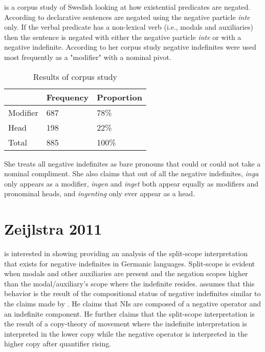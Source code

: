 \documentclass[12pt, letterpaper]{article}
\begin{document}
\ea \citet{valentinebordalNegationExistentialPredications2017} is a corpus study of Swedish looking at how existential predicates are negated. 
\ex According to \citeauthor{valentinebordalNegationExistentialPredications2017} declarative sentences are negated using the negative particle \textit{inte} only. 
\ex If the verbal predicate has a non-lexical verb (i.e., modals and auxiliaries) then the sentence is negated with either the negative particle \textit{inte} or with a negative indefinite. 
\ex According to her corpus study negative indefinites were used most frequently as a "modifier" with a nominal pivot.
\begin{table}[!h]
\centering
\caption{Results of  corpus study}
\begin{tabular}{lll}
& Frequency & Proportion\\
\hline
Modifier & 687 & 78\% \\
Head & 198 & 22\% \\
\hline
\hline 
Total & 885 & 100\%  
\end{tabular}
\end{table}
\ex She treats all negative indefinites as bare pronouns that could or could not take a nominal compliment. 
\ex She also claims that out of all the negative indefinites, \textit{inga} only appears as a modifier, \textit{ingen} and \textit{inget} both appear equally as modifiers and pronominal heads, and \textit{ingenting} only ever appear as a head. 
\z 

\section{Zeijlstra 2011} \label{sec:ZEIJLSTRA}

\ea \cite{zeijlstraSyntacticallyComplexStatus2011} is interested in showing providing an analysis of the split-scope interpretation that exists for negative indefinites in Germanic languages. 
\ex Split-scope is evident when modals and other auxiliaries are present and the negation scopes higher than the modal/auxiliary's scope where the indefinite resides. 
\ex \citeauthor{zeijlstraSyntacticallyComplexStatus2011} assumes that this behavior is the result of the compositional status of negative indefinites similar to the claims made by \citet{iatridouNegativeDPsAMovement2011}. He claims that NIs are composed of a negative operator and an indefinite component.
\ex He further claims that the split-scope interpretation is the result of a copy-theory of movement where the indefinite interpretation is interpreted in the lower copy while the negative operator is interpreted in the higher copy after quantifier rising. 
\z 
\end{document}
